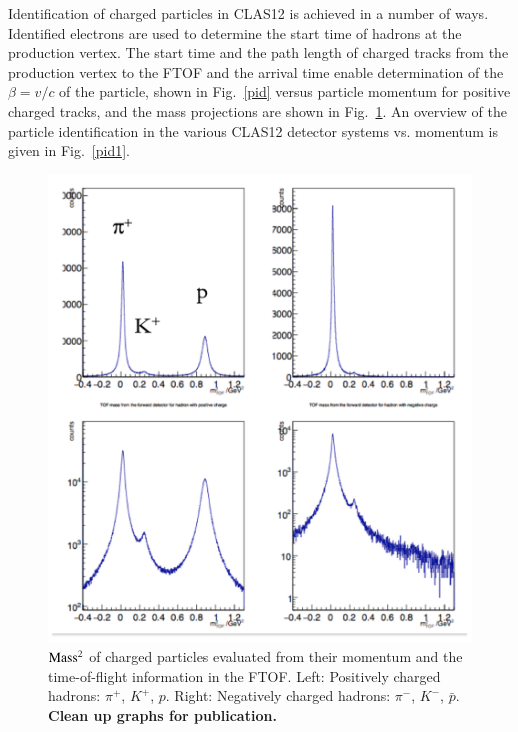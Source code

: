 \documentclass[final,3p,times,twocolumn,authoryear]{elsarticle}
\begin{document}
 Identification of charged particles in CLAS12 is achieved in a number of ways. Identified electrons are used to determine the start time of hadrons at the production vertex. The start time and the path length of charged tracks from the production vertex to the FTOF and the arrival time enable determination of the $\beta = v/c$ of the particle, shown in Fig.~\ref{pid} versus particle momentum for positive charged tracks, and the mass projections are shown in Fig.~\ref{pid-1D}.  An overview of the particle identification in the various CLAS12 detector systems vs. momentum is given in Fig.~\ref{pid1}. 
 \begin{figure}[htbp!]
\centerline{\includegraphics[width=1.0\columnwidth]{pid-1d.png}}
\caption{{$\rm Mass^2$} of charged particles evaluated from their momentum and the time-of-flight information in the FTOF. Left: Positively charged hadrons: $\pi^+$, 
$K^+$, $p$. Right: Negatively charged hadrons: $\pi^-$, $K^-$, ${\bar{p}}$. {\bf Clean up graphs for publication.} }
\label{pid-1D}
\end{figure} 
\end{document}
